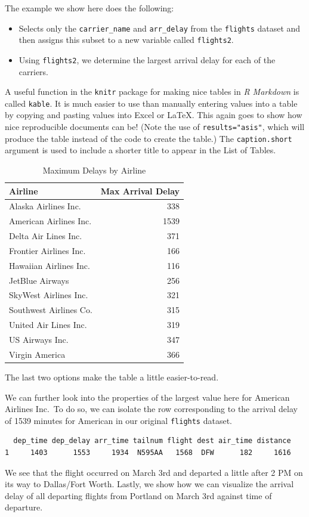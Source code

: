 \documentclass[12pt,twoside]{reedthesis}
\begin{document}
The example we show here does the following:
\begin{itemize}
\item
  Selects only the \texttt{carrier\_name} and \texttt{arr\_delay} from the \texttt{flights} dataset and then assigns this subset to a new variable called \texttt{flights2}.
\item
  Using \texttt{flights2}, we determine the largest arrival delay for each of the carriers.
\end{itemize}
A useful function in the \texttt{knitr} package for making nice tables in \emph{R Markdown} is called \texttt{kable}. It is much easier to use than manually entering values into a table by copying and pasting values into Excel or LaTeX. This again goes to show how nice reproducible documents can be! (Note the use of \texttt{results="asis"}, which will produce the table instead of the code to create the table.) The \texttt{caption.short} argument is used to include a shorter title to appear in the List of Tables.
\begin{longtable}[t]{lr}
\caption[Max Delays by Airline]{\label{tab:maxdelays}Maximum Delays by Airline}\\
\toprule
Airline & Max Arrival Delay\\
\midrule
Alaska Airlines Inc. & 338\\
American Airlines Inc. & 1539\\
Delta Air Lines Inc. & 371\\
Frontier Airlines Inc. & 166\\
Hawaiian Airlines Inc. & 116\\
\addlinespace
JetBlue Airways & 256\\
SkyWest Airlines Inc. & 321\\
Southwest Airlines Co. & 315\\
United Air Lines Inc. & 319\\
US Airways Inc. & 347\\
\addlinespace
Virgin America & 366\\
\bottomrule
\end{longtable}
The last two options make the table a little easier-to-read.

We can further look into the properties of the largest value here for American Airlines Inc.~To do so, we can isolate the row corresponding to the arrival delay of 1539 minutes for American in our original \texttt{flights} dataset.
\begin{verbatim}
  dep_time dep_delay arr_time tailnum flight dest air_time distance
1     1403      1553     1934  N595AA   1568  DFW      182     1616
\end{verbatim}
We see that the flight occurred on March 3rd and departed a little after 2 PM on its way to Dallas/Fort Worth. Lastly, we show how we can visualize the arrival delay of all departing flights from Portland on March 3rd against time of departure.
\end{document}
